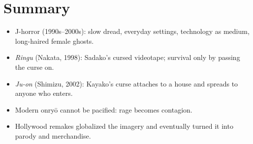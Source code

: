 \section*{Summary}
\begin{itemize}
  \item J-horror (1990s--2000s): slow dread, everyday settings, technology as medium,
        long-haired female ghosts.
  \item \emph{Ringu} (Nakata, 1998): Sadako's cursed videotape; survival only by passing
        the curse on.
  \item \emph{Ju-on} (Shimizu, 2002): Kayako's curse attaches to a house and spreads to
        anyone who enters.
  \item Modern onryō cannot be pacified: rage becomes contagion.
  \item Hollywood remakes globalized the imagery and eventually turned it into parody and
        merchandise.
\end{itemize}
